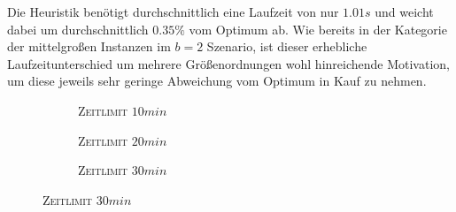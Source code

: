 Die Heuristik benötigt durchschnittlich eine Laufzeit von nur $1.01s$ und weicht dabei um durchschnittlich
$0.35 \%$ vom Optimum ab. Wie bereits in der Kategorie der mittelgroßen Instanzen im $b = 2$ Szenario, ist dieser erhebliche
Laufzeitunterschied um mehrere Größenordnungen wohl hinreichende Motivation, um diese jeweils sehr geringe Abweichung
vom Optimum in Kauf zu nehmen.

\begin{figure}[H]
\begin{subfigure}[b]{0.3\textwidth}
\centering
{}
\caption{\textsc{Zeitlimit} $10min$}
\label{fig:mip_results_b=3_m_a}
\end{subfigure}
\begin{subfigure}[b]{0.3\textwidth}
\centering
{}
\caption{\textsc{Zeitlimit} $20min$}
\label{fig:mip_results_b=3_m_b}
\end{subfigure}
\begin{subfigure}[b]{0.3\textwidth}
\centering
{}
\caption{\textsc{Zeitlimit} $30min$}
\label{fig:mip_results_b=3_m_c}
\end{subfigure}


\end{figure}
